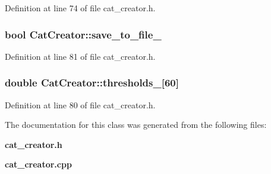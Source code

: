\-Definition at line 74 of file cat\-\_\-creator.\-h.

\subsubsection[{save\-\_\-to\-\_\-file\-\_\-}]{\setlength{\rightskip}{0pt plus 5cm}bool {\bf \-Cat\-Creator\-::save\-\_\-to\-\_\-file\-\_\-}\hspace{0.3cm}{\ttfamily  [private]}}\label{classCatCreator_a5070f156d650bd7e8d0433a6ebd0787e}


\-Definition at line 81 of file cat\-\_\-creator.\-h.

\subsubsection[{thresholds\-\_\-}]{\setlength{\rightskip}{0pt plus 5cm}double {\bf \-Cat\-Creator\-::thresholds\-\_\-}[60]\hspace{0.3cm}{\ttfamily  [private]}}\label{classCatCreator_a170801897a689342af7ba274efc2c047}


\-Definition at line 80 of file cat\-\_\-creator.\-h.



\-The documentation for this class was generated from the following files\-:\begin{DoxyCompactItemize}
\item 
{\bf cat\-\_\-creator.\-h}\item 
{\bf cat\-\_\-creator.\-cpp}\end{DoxyCompactItemize}

